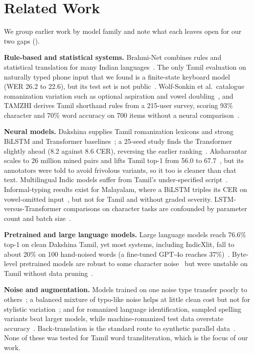 \documentclass[conference]{IEEEtran}
\begin{document}
\section{Related Work}
We group earlier work by model family and note what each leaves open for our two gaps ().

\textbf{Rule-based and statistical systems.}
Brahmi-Net combines rules and statistical translation for many Indian languages~\cite{kunchukuttan2015brahminet}.
The only Tamil evaluation on naturally typed phone input that we found is a finite-state keyboard model (WER 26.2 to 22.6), but its test set is not public~\cite{hellsten2017keyboard}.
Wolf-Sonkin et al.\ catalogue romanization variation such as optional aspiration and vowel doubling~\cite{wolfsonkin2019latin}, and TAMZHI derives Tamil shorthand rules from a 215-user survey, scoring 93\% character and 70\% word accuracy on 700 items without a neural comparison~\cite{herath2024tamzhi}.

\textbf{Neural models.}
Dakshina supplies Tamil romanization lexicons and strong BiLSTM and Transformer baselines~\cite{roark2020dakshina}; a 25-seed study finds the Transformer slightly ahead (8.2 against 8.6 CER), reversing the earlier ranking~\cite{kirov2024context}.
Aksharantar scales to 26 million mined pairs and lifts Tamil top-1 from 56.0 to 67.7~\cite{madhani2023aksharantar}, but its annotators were told to avoid frivolous variants, so it too is cleaner than chat text.
Multilingual Indic models suffer from Tamil's under-specified script~\cite{kunchukuttan2021largescale,kunchukuttan2018orthographic}.
Informal-typing results exist for Malayalam, where a BiLSTM triples its CER on vowel-omitted input~\cite{baiju2024malayalam,sumanathilaka2025indonlp}, but not for Tamil and without graded severity.
LSTM-versus-Transformer comparisons on character tasks are confounded by parameter count and batch size~\cite{moran2020effective,wu2021applying}.

\textbf{Pretrained and large language models.}
Large language models reach 76.6\% top-1 on clean Dakshina Tamil, yet most systems, including IndicXlit, fall to about 20\% on 100 hand-noised words (a fine-tuned GPT-4o reaches 37\%)~\cite{azam2025beyond}.
Byte-level pretrained models are robust to some character noise~\cite{xue2022byt5} but were unstable on Tamil without data pruning~\cite{kirov2024context}.

\textbf{Noise and augmentation.}
Models trained on one noise type transfer poorly to others~\cite{belinkov2018synthetic}; a balanced mixture of typo-like noise helps at little clean cost but not for stylistic variation~\cite{karpukhin2019training}; and for romanized language identification, sampled spelling variants beat larger models, while machine-romanized test data overstate accuracy~\cite{benton2025romanizedlid,madhani2023bhasha}.
Back-translation is the standard route to synthetic parallel data~\cite{sennrich2016backtranslation}.
None of these was tested for Tamil word transliteration, which is the focus of our work.
\end{document}
